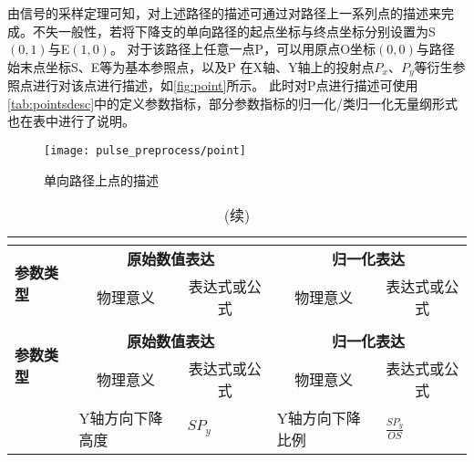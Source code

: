 由信号的采样定理可知，对上述路径的描述可通过对路径上一系列点的描述来完成。不失一般性，若将下降支的单向路径的起点坐标与终点坐标分别设置为S$(0,1)$与E$(1,0)$。
对于该路径上任意一点P，可以用原点O坐标$(0,0)$与路径始末点坐标S、E等为基本参照点，以及P
在X轴、Y轴上的投射点$P_x$、$P_y$等衍生参照点进行对该点进行描述，如\autoref{fig:point}所示。
此时对P点进行描述可使用\autoref{tab:pointsdesc}中的定义参数指标，部分参数指标的归一化/类归一化无量纲形式也在表中进行了说明。
\begin{figure}[htbp]
    \centering
    \texttt{[image: pulse\_preprocess/point]}
    \caption{\label{fig:point}单向路径上点的描述}
\end{figure}
\begin{center}
    \fontsize{10}{4}
    \begin{longtable}{m{1.57cm}<{\centering}m{4.07cm}<{\centering}m{2.07cm}<{\centering}m{4.07cm}<{\centering}m{2.07cm}<{\centering}}
		\caption{单向路径上任意一点的描述指标一览}\\
		\label{tab:pointsdesc}\\
		\hline\hline
        \multirow{2}[2]{*}{\textbf{参数类型}} & \multicolumn{2}{c}{\textbf{原始数值表达}} & \multicolumn{2}{c}{\textbf{归一化表达}} \\
            & \multicolumn{1}{c}{物理意义} & \multicolumn{1}{c}{表达式或公式} & \multicolumn{1}{c}{物理意义} & \multicolumn{1}{c}{表达式或公式} \\
        \hline
        \endfirsthead
        \caption[]{(续)}\\
        \hline
        \multirow{2}[2]{*}{\textbf{参数类型}} & \multicolumn{2}{c}{\textbf{原始数值表达}} & \multicolumn{2}{c}{\textbf{归一化表达}} \\
            & \multicolumn{1}{c}{物理意义} & \multicolumn{1}{c}{表达式或公式} & \multicolumn{1}{c}{物理意义} & \multicolumn{1}{c}{表达式或公式} \\
        \hline
        \endhead 
        \hline
        \endfoot
        \hline\hline
        \endlastfoot
                                    & Y轴方向下降高度           &   $SP_y$      &  Y轴方向下降比例     & $\frac{SP_y}{OS}$ \\

\end{longtable}
\end{center}
